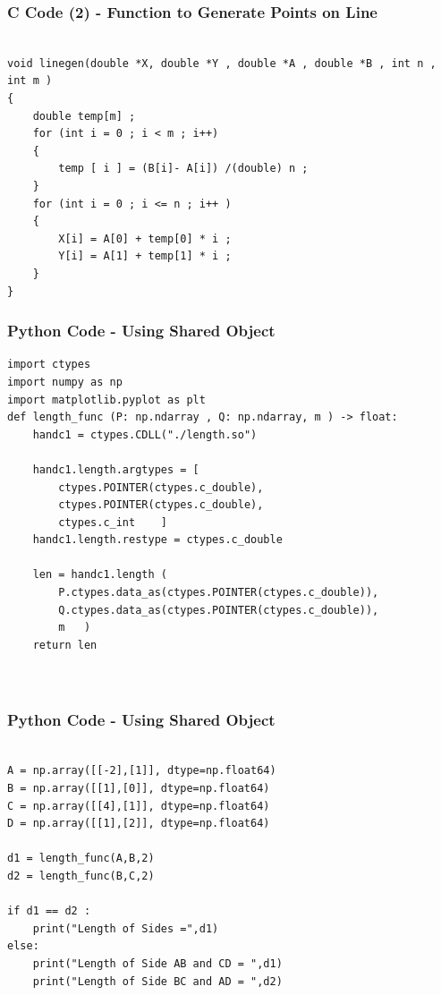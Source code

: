 \documentclass{beamer}
\begin{document}
\begin{frame}[fragile]
    \frametitle{C Code (2) - Function to Generate Points on Line}
    \begin{lstlisting}

void linegen(double *X, double *Y , double *A , double *B , int n , int m )
{
    double temp[m] ; 
    for (int i = 0 ; i < m ; i++)
    {
        temp [ i ] = (B[i]- A[i]) /(double) n ; 
    }
    for (int i = 0 ; i <= n ; i++ )
    {
        X[i] = A[0] + temp[0] * i ; 
        Y[i] = A[1] + temp[1] * i ;
    }
}

\end{lstlisting}
\end{frame}

\begin{frame}[fragile]
    \frametitle{Python Code - Using Shared Object}
    \begin{lstlisting}
import ctypes
import numpy as np
import matplotlib.pyplot as plt
def length_func (P: np.ndarray , Q: np.ndarray, m ) -> float:
    handc1 = ctypes.CDLL("./length.so")

    handc1.length.argtypes = [
        ctypes.POINTER(ctypes.c_double),
        ctypes.POINTER(ctypes.c_double),
        ctypes.c_int    ]
    handc1.length.restype = ctypes.c_double

    len = handc1.length (
        P.ctypes.data_as(ctypes.POINTER(ctypes.c_double)),
        Q.ctypes.data_as(ctypes.POINTER(ctypes.c_double)),
        m   )
    return len



\end{lstlisting}
\end{frame}

\begin{frame}[fragile]
    \frametitle{Python Code - Using Shared Object}
    \begin{lstlisting}
    
A = np.array([[-2],[1]], dtype=np.float64)
B = np.array([[1],[0]], dtype=np.float64)
C = np.array([[4],[1]], dtype=np.float64)
D = np.array([[1],[2]], dtype=np.float64)

d1 = length_func(A,B,2)
d2 = length_func(B,C,2)

if d1 == d2 :
    print("Length of Sides =",d1)
else:
    print("Length of Side AB and CD = ",d1)
    print("Length of Side BC and AD = ",d2)

\end{lstlisting}
\end{frame}
\end{document}
